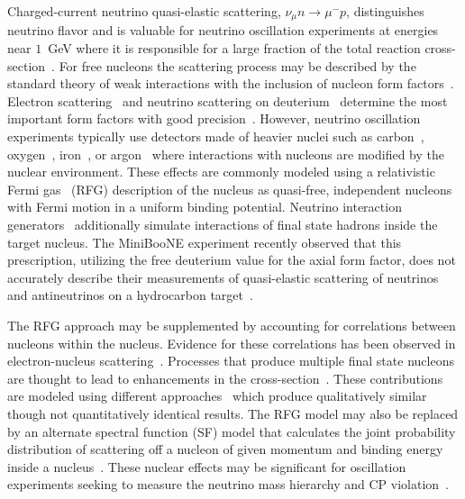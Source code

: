 Charged-current neutrino quasi-elastic scattering,
$\nu_\mu n\to\mu^-p$, distinguishes neutrino flavor and is valuable for 
neutrino oscillation experiments at energies near $1$~GeV
where it is responsible for a large fraction of the total reaction
cross-section~\cite{AguilarArevalo:2010wv,AguilarArevalo:2008rc,Abe:2011sj,Ayres:2004js}. For free nucleons the scattering process may be described by the standard theory of weak interactions with the inclusion of nucleon form factors~\cite{LlewellynSmith:1971zm}.   
Electron scattering~\cite{Bradford:2006yz} and neutrino scattering on deuterium~\cite{Bodek:2007vi,Kuzmin:2007kr} determine the most important form factors with good precision~\cite{Day:2012gb}.
However, neutrino oscillation experiments typically use detectors made of
heavier nuclei such as carbon~\cite{AguilarArevalo:2008qa,Ayres:2004js}, 
oxygen~\cite{Abe:2011ks}, iron~\cite{Michael:2008bc},  
or argon~\cite{Chen:2007ae, LBNE} where interactions with nucleons are 
modified by the nuclear environment.
These effects are commonly modeled using a 
relativistic Fermi gas~\cite{Smith:1972xh,Bodek:1980ar} 
(RFG) description of the nucleus as quasi-free, independent
nucleons with Fermi motion in a uniform binding potential.
Neutrino interaction generators~\cite{Andreopoulos201087,Hayato:2009zz,Golan:2012wx,Buss:2011mx,Lalakulich:2012gm} additionally simulate interactions of final state hadrons inside the target nucleus. The MiniBooNE experiment recently observed that this 
prescription, utilizing the free deuterium value for the axial form factor, does not accurately describe their
measurements of quasi-elastic scattering of neutrinos and
antineutrinos on a hydrocarbon target~\cite{AguilarArevalo:2007ab,AguilarArevalo:2013hm}.

The RFG approach may be supplemented by accounting for correlations between 
nucleons within the nucleus. Evidence for these correlations 
has been observed in electron-nucleus scattering~\cite{Subedi:2008zz}.
Processes that produce multiple final state nucleons are thought to lead to enhancements in the cross-section~\cite{Carlson:2001mp,Shen:2012xz,Bodek:2011ps}.
These contributions are modeled using
different approaches~\cite{Martini:2010ex,Martini:2013sha,Nieves:2005rq} which
produce qualitatively similar though not quantitatively identical results.
The RFG model may also be replaced by an alternate spectral 
function (SF) model that calculates the joint probability distribution of 
scattering off a nucleon of given momentum and binding energy 
inside a nucleus~\cite{Benhar:1994hw}.
These nuclear effects may be significant for oscillation experiments 
seeking to measure the neutrino mass hierarchy 
and CP violation~\cite{Nieves:2012yz,Lalakulich:2012hs,Martini:2012uc}.

